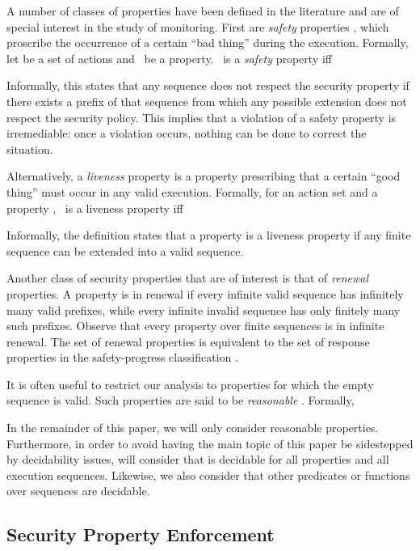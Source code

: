 \documentclass[12pt]{article}
\begin{document}
A number of classes of properties have been defined in the literature and are of special interest in the study of monitoring. First are {\it safety} properties \cite{safety}, which proscribe the occurrence of a certain ``bad thing'' during the execution. Formally, let  be a set of actions and  \Property\ be a property. \Property\ is a {\it safety} property iff


Informally, this states that any sequence does not respect the security property if there exists a prefix of that sequence from which any possible extension does not respect the security policy.   This implies that a violation of a safety property is irremediable: once a violation occurs, nothing can be done to correct the situation.

Alternatively, a {\it liveness} property \cite{defliv} is a property prescribing that a certain ``good thing'' must occur in any valid execution. Formally, for an action set  and a property \Property, \Property\ is a liveness property iff


Informally, the definition states that a property is a liveness property if any finite sequence can be extended into a valid sequence.

Another class of security properties that are of interest is that of {\it renewal} properties\cite{nonsafetyJournal}. A property is in renewal if every infinite valid sequence has infinitely many valid prefixes, while every infinite invalid sequence has only finitely many such prefixes. Observe that every property over finite sequences is in infinite renewal.  The set of renewal properties is equivalent to the set of response properties in the safety-progress classification \cite{safPro}.


It is often useful to restrict our analysis to properties for which the empty sequence  is valid. Such properties are said to be \textit{reasonable} \cite{nonsafetyJournal}.  Formally,


In the remainder of this paper, we will only consider reasonable properties.  Furthermore, in order to avoid having the main topic of this paper be sidestepped by decidability issues, will consider that  is decidable for all properties and all execution sequences. Likewise, we also consider that other predicates or functions over sequences are decidable.

\subsection{Security Property Enforcement}
\end{document}
